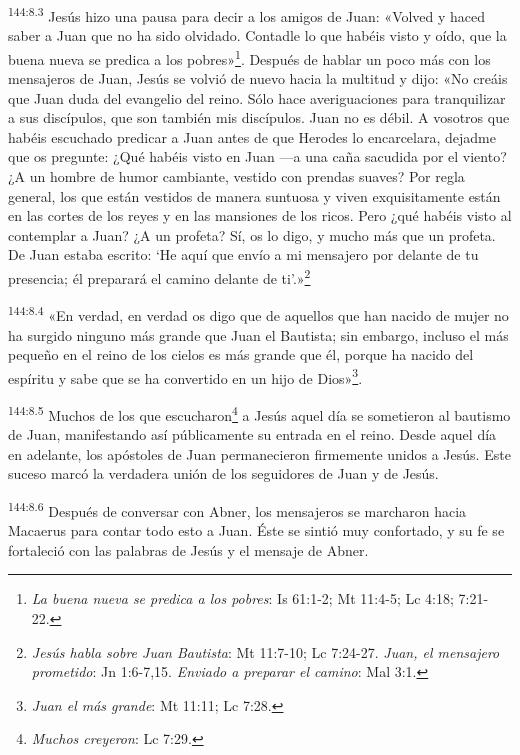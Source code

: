 \par 
\textsuperscript{144:8.3} Jesús hizo una pausa para decir a los amigos de Juan: «Volved y haced saber a Juan que no ha sido olvidado. Contadle lo que habéis visto y oído, que la buena nueva se predica a los pobres»\footnote{\textit{La buena nueva se predica a los pobres}: Is 61:1-2; Mt 11:4-5; Lc 4:18; 7:21-22.}. Después de hablar un poco más con los mensajeros de Juan, Jesús se volvió de nuevo hacia la multitud y dijo: «No creáis que Juan duda del evangelio del reino. Sólo hace averiguaciones para tranquilizar a sus discípulos, que son también mis discípulos. Juan no es débil. A vosotros que habéis escuchado predicar a Juan antes de que Herodes lo encarcelara, dejadme que os pregunte: ¿Qué habéis visto en Juan ---a una caña sacudida por el viento? ¿A un hombre de humor cambiante, vestido con prendas suaves? Por regla general, los que están vestidos de manera suntuosa y viven exquisitamente están en las cortes de los reyes y en las mansiones de los ricos. Pero ¿qué habéis visto al contemplar a Juan? ¿A un profeta? Sí, os lo digo, y mucho más que un profeta. De Juan estaba escrito: `He aquí que envío a mi mensajero por delante de tu presencia; él preparará el camino delante de ti'.»\footnote{\textit{Jesús habla sobre Juan Bautista}: Mt 11:7-10; Lc 7:24-27. \textit{Juan, el mensajero prometido}: Jn 1:6-7,15. \textit{Enviado a preparar el camino}: Mal 3:1.}

\par 
\textsuperscript{144:8.4} «En verdad, en verdad os digo que de aquellos que han nacido de mujer no ha surgido ninguno más grande que Juan el Bautista; sin embargo, incluso el más pequeño en el reino de los cielos es más grande que él, porque ha nacido del espíritu y sabe que se ha convertido en un hijo de Dios»\footnote{\textit{Juan el más grande}: Mt 11:11; Lc 7:28.}.

\par 
\textsuperscript{144:8.5} Muchos de los que escucharon\footnote{\textit{Muchos creyeron}: Lc 7:29.} a Jesús aquel día se sometieron al bautismo de Juan, manifestando así públicamente su entrada en el reino. Desde aquel día en adelante, los apóstoles de Juan permanecieron firmemente unidos a Jesús. Este suceso marcó la verdadera unión de los seguidores de Juan y de Jesús.

\par 
\textsuperscript{144:8.6} Después de conversar con Abner, los mensajeros se marcharon hacia Macaerus para contar todo esto a Juan. Éste se sintió muy confortado, y su fe se fortaleció con las palabras de Jesús y el mensaje de Abner.

